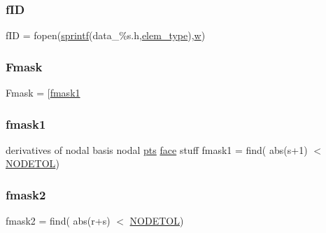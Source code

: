\subsubsection{\texorpdfstring{f\+ID}{fID}}
{\footnotesize\ttfamily f\+ID = fopen(\hyperlink{a00575_ae6aab5c308faac0fc539cc9c6da9fbd0}{sprintf}(\textquotesingle{}data\+\_\+\%s.\+h\textquotesingle{},\hyperlink{a00473_a9e84386471d07238c03b10507f58eba9}{elem\+\_\+type}),\textquotesingle{}\hyperlink{a00605_aad57484016654da87125db86f4227ea3}{w}\textquotesingle{})}

\mbox{\label{a00473_a9d248ff3c701af57ed3e241d735bd034}} 
\subsubsection{\texorpdfstring{Fmask}{Fmask}}
{\footnotesize\ttfamily Fmask = \mbox{[}\hyperlink{a00575_a94fc3ab9217cab318ada4ca502b10620}{fmask1}}

\mbox{\label{a00473_a1a1dec21df6e8b9d02462f97b957473d}} 
\subsubsection{\texorpdfstring{fmask1}{fmask1}}
{\footnotesize\ttfamily derivatives of nodal basis nodal \hyperlink{a00473_a7d2fb616b76863109aa80a7ffdfad72b}{pts} \hyperlink{a00611_ac4ec0037ba529da25bf084669a45f60c}{face} stuff fmask1 = find( abs(s+1) $<$ \hyperlink{a00575_a409781c62c346e9048df00ae7d289582}{N\+O\+D\+E\+T\+OL})\textquotesingle{}}

\mbox{\label{a00473_a2db7941f6935f48a7799d8214a5da8e7}} 
\subsubsection{\texorpdfstring{fmask2}{fmask2}}
{\footnotesize\ttfamily fmask2 = find( abs(r+s) $<$ \hyperlink{a00575_a409781c62c346e9048df00ae7d289582}{N\+O\+D\+E\+T\+OL})\textquotesingle{}}

